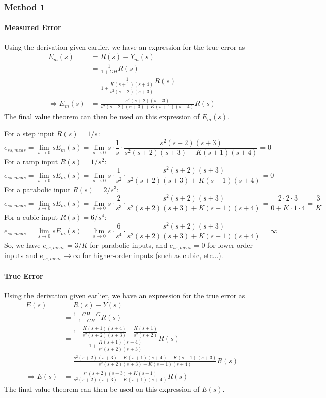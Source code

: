 \documentclass{book}
\begin{document}
\subsubsection*{Method 1}
\paragraph*{Measured Error}  Using the derivation given earlier, we have an expression for the true error as
\begin{align*}
E_m(s) &= R(s) - Y_m(s) \\
&= \frac{1}{1+GH}R(s) \\
&= \frac{1}{1+\dfrac{K(s+1)(s+4)}{s^2(s+2)(s+3)}} R(s) \\
\Rightarrow E_m(s) &= \frac{s^2(s+2)(s+3)}{s^2(s+2)(s+3)+K(s+1)(s+4)} R(s)
\end{align*}
The final value theorem can then be used on this expression of $ E_m(s) $. 

\noindent For a step input $ R(s) = 1/s $:
\[ e_{ss,meas} = \lim_{s\to0} sE_m(s) = \lim_{s\to0} s\cdot\frac{1}{s} \cdot \frac{s^2(s+2)(s+3)}{s^2(s+2)(s+3)+K(s+1)(s+4)} = 0  \]
For a ramp input $ R(s) = 1/s^2 $:
\[ e_{ss,meas} = \lim_{s\to0} sE_m(s) = \lim_{s\to0} s\cdot\frac{1}{s^2} \cdot \frac{s^2(s+2)(s+3)}{s^2(s+2)(s+3)+K(s+1)(s+4)} = 0  \]
For a parabolic input $ R(s) = 2/s^3 $:
\[ e_{ss,meas} = \lim_{s\to0} sE_m(s) = \lim_{s\to0} s\cdot\frac{2}{s^3} \cdot \frac{s^2(s+2)(s+3)}{s^2(s+2)(s+3)+K(s+1)(s+4)} = \frac{2\cdot2\cdot3}{0+K\cdot1\cdot4} = \frac{3}{K}  \]
For a cubic input $ R(s) = 6/s^4 $:
\[ e_{ss,meas} = \lim_{s\to0} sE_m(s) = \lim_{s\to0} s\cdot\frac{6}{s^4} \cdot \frac{s^2(s+2)(s+3)}{s^2(s+2)(s+3)+K(s+1)(s+4)} = \infty  \]
So, we have $ e_{ss,meas} = 3/K $ for parabolic inputs, and $ e_{ss,meas} = 0 $ for lower-order inputs and $  e_{ss,meas}\to\infty $ for higher-order inputs (such as cubic, etc...).

\paragraph*{True Error} Using the derivation given earlier, we have an expression for the true error as
\begin{align*}
E(s) &= R(s) - Y(s) \\
&= \frac{1+GH-G}{1+GH}R(s) \\
&= \frac{1+\dfrac{K(s+1)(s+4)}{s^2(s+2)(s+3)}-\dfrac{K(s+1)}{s^2(s+2)}}{1+\dfrac{K(s+1)(s+4)}{s^2(s+2)(s+3)}} R(s) \\
&= \frac{ s^2(s+2)(s+3) + K(s+1)(s+4) - K(s+1)(s+3) }{ s^2(s+2)(s+3) + K(s+1)(s+4) } R(s) \\
\Rightarrow E(s) &= \frac{ s^2(s+2)(s+3) + K(s+1) }{ s^2(s+2)(s+3) + K(s+1)(s+4) } R(s)
\end{align*}
The final value theorem can then be used on this expression of $ E(s) $.
\end{document}
